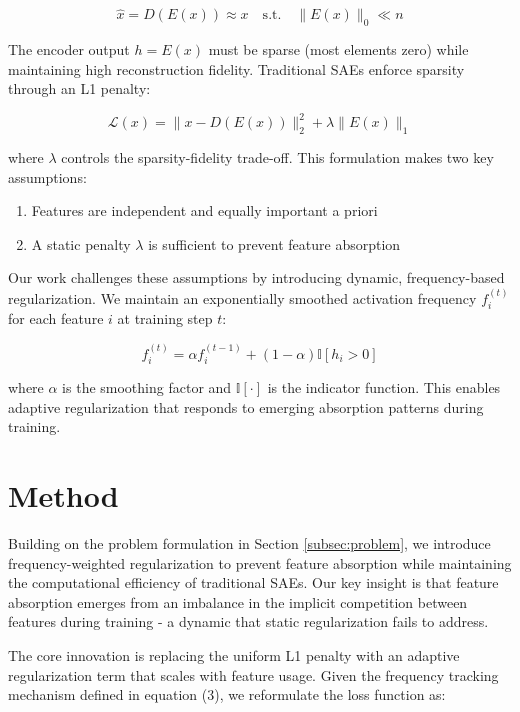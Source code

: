 \documentclass{article} %
\begin{document}
\begin{equation}
    \hat{x} = D(E(x)) \approx x \quad \text{s.t.} \quad \|E(x)\|_0 \ll n
\end{equation}

The encoder output $h = E(x)$ must be sparse (most elements zero) while maintaining high reconstruction fidelity. Traditional SAEs enforce sparsity through an L1 penalty:

\begin{equation}
    \mathcal{L}(x) = \|x - D(E(x))\|_2^2 + \lambda\|E(x)\|_1
\end{equation}

where $\lambda$ controls the sparsity-fidelity trade-off. This formulation makes two key assumptions:

\begin{enumerate}
    \item Features are independent and equally important a priori
    \item A static penalty $\lambda$ is sufficient to prevent feature absorption
\end{enumerate}

Our work challenges these assumptions by introducing dynamic, frequency-based regularization. We maintain an exponentially smoothed activation frequency $f_i^{(t)}$ for each feature $i$ at training step $t$:

\begin{equation}
    f_i^{(t)} = \alpha f_i^{(t-1)} + (1-\alpha)\mathbb{I}[h_i > 0]
\end{equation}

where $\alpha$ is the smoothing factor and $\mathbb{I}[\cdot]$ is the indicator function. This enables adaptive regularization that responds to emerging absorption patterns during training.

\section{Method}
\label{sec:method}

Building on the problem formulation in Section \ref{subsec:problem}, we introduce frequency-weighted regularization to prevent feature absorption while maintaining the computational efficiency of traditional SAEs. Our key insight is that feature absorption emerges from an imbalance in the implicit competition between features during training - a dynamic that static regularization fails to address.

The core innovation is replacing the uniform L1 penalty with an adaptive regularization term that scales with feature usage. Given the frequency tracking mechanism defined in equation (3), we reformulate the loss function as:
\end{document}
